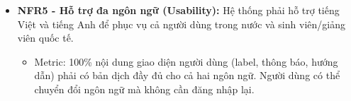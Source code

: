 \begin{itemize}
    \item \textbf{NFR5 - Hỗ trợ đa ngôn ngữ (Usability):} Hệ thống phải hỗ trợ tiếng Việt và tiếng Anh để phục vụ cả người dùng trong nước và sinh viên/giảng viên quốc tế. %
    \vspace*{-5pt}
    \begin{itemize}
        \item Metric: 100\% nội dung giao diện người dùng (label, thông báo, hướng dẫn) phải có bản dịch đầy đủ cho cả hai ngôn ngữ. %
        Người dùng có thể chuyển đổi ngôn ngữ mà không cần đăng nhập lại. %
    \end{itemize}
\end{itemize}
